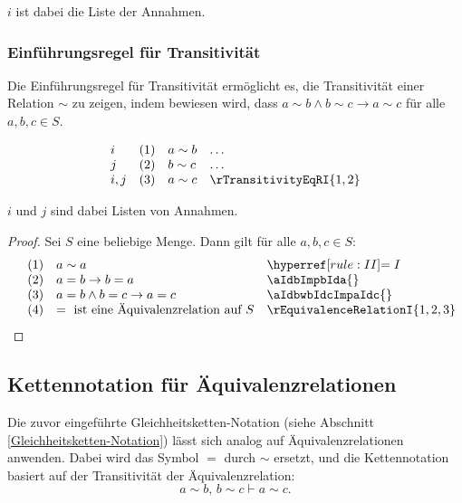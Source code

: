 \documentclass[main.tex]{subfiles}
\begin{document}
\(i\) ist dabei die Liste der Annahmen.

\subsubsection*{Einführungsregel für Transitivität}
\label{rule:rTransitivityEqRI}
Die Einführungsregel für Transitivität ermöglicht es, die Transitivität einer Relation \(\sim\) zu zeigen, indem bewiesen wird, dass \(a \sim b \land b \sim c \rightarrow a \sim c\) für alle \(a, b, c \in S\).

\[
\begin{array}{llll}
    i           & (1) & a \sim b & \dots \\
    j           & (2) & b \sim c & \dots \\
    i,j         & (3) & a \sim c & \rTransitivityEqRI{1,2}
\end{array}
\]

\(i\) und \(j\) sind dabei Listen von Annahmen.

\label{FaSLpEqualsInEquivalencerelationSRp}
\begin{theorem}[\(\forall S(= \text{ ist eine Äquivalenzrelation auf } S)\)]
\end{theorem}
\begin{proof}
    Sei \(S\) eine beliebige Menge. Dann gilt für alle \(a,b,c\in S\):
	\[
	\begin{array}{llll}
		    & (1) & a \sim a & \rII{}\\
                & (2) & a=b\rightarrow b=a & \aIdbImpbIda{}\\
		    & (3) & a=b\land b=c\rightarrow a=c & \aIdbwbIdcImpaIdc{}\\
                & (4) & = \text{ ist eine Äquivalenzrelation auf } S & \rEquivalenceRelationI{1,2,3}\\
	\end{array}
	\]
\end{proof}


\subsection{Kettennotation für Äquivalenzrelationen}

Die zuvor eingeführte Gleichheitsketten-Notation (siehe Abschnitt \ref{Gleichheitsketten-Notation}) lässt sich analog auf Äquivalenzrelationen anwenden. Dabei wird das Symbol \(=\) durch \(\sim\) ersetzt, und die Kettennotation basiert auf der Transitivität der Äquivalenzrelation:
\[
a \sim b, \, b \sim c \vdash a \sim c.
\]
\end{document}
